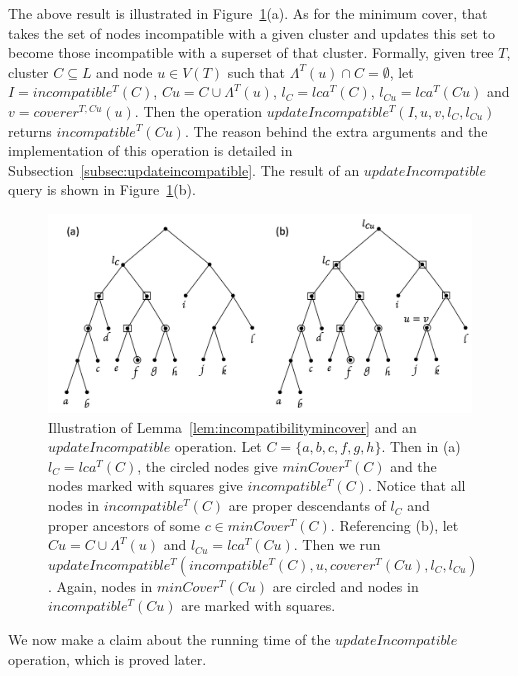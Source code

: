 \documentclass{article}
\newcommand{\leafset}{\Lambda}
\begin{document}
    The above result is illustrated in Figure~\ref{fig:incompatibility}(a). As for the minimum cover, that takes the set of nodes incompatible with a given cluster and updates this set to become those incompatible with a superset of that cluster. Formally, given tree $T$, cluster $C \subseteq L$ and node $u \in V(T)$ such that $\leafset^{T}(u) \cap C = \emptyset$, let $I = incompatible^{T}(C)$, $Cu = C \cup \leafset^{T}(u)$, $l_C = lca^{T}(C)$, $l_{Cu} = lca^{T}(Cu)$ and $v = coverer^{T, Cu}(u)$. Then the operation $updateIncompatible^{T}(I, u, v, l_C, l_{Cu})$ returns $incompatible^{T}(Cu)$. The reason behind the extra arguments and the implementation of this operation is detailed in Subsection~\ref{subsec:updateincompatible}. The result of an $updateIncompatible$ query is shown in Figure~\ref{fig:incompatibility}(b).

    \begin{figure}[ht]
        \includegraphics[scale=0.5]{incompatibility}
        \centering
        \caption{Illustration of Lemma~\ref{lem:incompatibilitymincover} and an $updateIncompatible$ operation. Let $C = \{a, b, c, f, g, h\}$. Then in (a) $l_C = lca^T(C)$, the circled nodes give $minCover^{T}(C)$ and the nodes marked with squares give $incompatible^T(C)$. Notice that all nodes in $incompatible^T(C)$ are proper descendants of $l_C$ and proper ancestors of some $c \in minCover^{T}(C)$. Referencing (b), let $Cu = C \cup \leafset^{T}(u)$ and $l_{Cu} = lca^{T}(Cu)$. Then we run $updateIncompatible^{T}(incompatible^{T}(C), u, coverer^{T}(Cu), l_C, l_{Cu})$. Again, nodes in $minCover^{T}(Cu)$ are circled and nodes in $incompatible^{T}(Cu)$ are marked with squares.}
        \label{fig:incompatibility}
    \end{figure}

    We now make a claim about the running time of the $updateIncompatible$ operation, which is proved later.
    \newline
\end{document}
